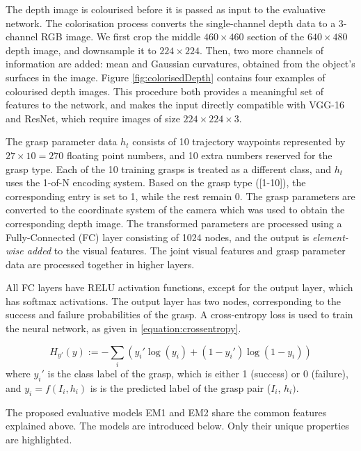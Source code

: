 The depth image is colourised before it is passed as input to the evaluative network. The colorisation process converts the single-channel depth data to a 3-channel RGB image. We first crop the middle $460 \times 460$ section of the $640 \times 480$ depth image, and downsample it to $224 \times 224$. Then, two more channels of information are added: mean and Gaussian curvatures, obtained from the object's surfaces in the image. Figure \ref{fig:colorisedDepth} contains four examples of colourised depth images. This procedure both provides a meaningful set of features to the network, and makes the input directly compatible with VGG-16 and ResNet, which require images of size $224 \times 224 \times 3$.

The grasp parameter data $h_t$ consists of 10 trajectory waypoints represented by $27 \times 10 = 270$ floating point numbers, and 10 extra numbers reserved for the grasp type. Each of the 10 training grasps is treated as a different class, and $h_t$ uses the 1-of-N encoding system. Based on the grasp type ([1-10]), the corresponding entry is set to 1, while the rest remain 0. The grasp parameters are converted to the coordinate system of the camera which was used to obtain the corresponding depth image. The transformed parameters are processed using a Fully-Connected (FC) layer consisting of 1024 nodes, and the output is \textit{element-wise added} to the visual features. The joint visual features and grasp parameter data are processed together in higher layers.

All FC layers have RELU activation functions, except for the output layer, which has softmax activations. The output layer has two nodes, corresponding to the success and failure probabilities of the grasp. A cross-entropy loss is used to train the neural network, as given in \eq\ref{equation:crossentropy}.

\begin{equation}
H_{y'}(y) := - \sum_{i} ({y_i' \log(y_i) + (1-y_i') \log (1-y_i)})
\label{equation:crossentropy}
\end{equation}
where $y_i'$ is the class label of the grasp, which is either 1 (success) or 0 (failure), and $y_i = f(I_i, h_i)$ is is the predicted label of the grasp pair ($I_i$, $h_i)$.

The proposed evaluative models EM1 and EM2 share the common features explained above. The models are introduced below. Only their unique properties are highlighted.

